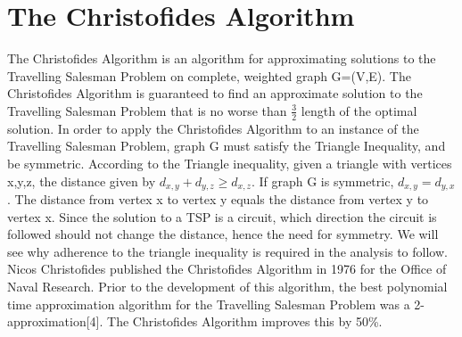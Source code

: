 \documentclass[12pt, oneside]{article}   	%
\begin{document}
\section{The Christofides Algorithm}
\indent\indent The Christofides Algorithm is an algorithm for approximating solutions to the Travelling Salesman Problem on complete, weighted graph G=(V,E).  The Christofides Algorithm is guaranteed to find an approximate solution to the Travelling Salesman Problem that is no worse than $\frac{3}{2}$ length of the optimal solution.  In order to apply the Christofides Algorithm to an instance of the Travelling Salesman Problem, graph G must satisfy the Triangle Inequality, and be symmetric.  According to the Triangle inequality, given a triangle with vertices x,y,z, the distance given by $d_{x,y} + d_{y,z} \geq d_{x,z}$.  If graph G is symmetric, $d_{x,y} = d_{y,x}$.  The distance from vertex x to vertex y equals the distance from vertex y to vertex x.  Since the solution to a TSP is a circuit, which direction the circuit is followed should not change the distance, hence the need for symmetry.  We will see why adherence to the triangle inequality is required in the analysis to follow.\\
\indent Nicos Christofides published the Christofides Algorithm in 1976 for the Office of Naval Research.  Prior to the development of this algorithm, the best polynomial time approximation algorithm for the Travelling Salesman Problem was a 2-approximation[4].  The Christofides Algorithm improves this by 50\%.\\
\end{document}
